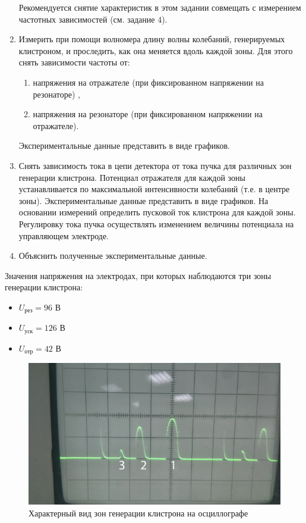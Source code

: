\begin{enumerate}
	Рекомендуется снятие характеристик в этом задании совмещать с измерением частотных зависимостей (см. задание 4).

	\item Измерить при помощи волномера длину волны колебаний, генерируемых клистроном, и проследить, как она меняется вдоль каждой зоны. Для
	этого снять зависимости частоты от:
		\begin{enumerate}
			\item  напряжения на отражателе (при фиксированном напряжении на резонаторе) ,
			\item  напряжения на резонаторе (при фиксированном напряжении на отражателе).
		\end{enumerate}
	
	Экспериментальные данные представить в виде графиков.

	\item  Снять зависимость тока в цепи детектора от тока пучка для различных зон генерации клистрона. Потенциал отражателя для каждой зоны устанавливается по максимальной интенсивности колебаний (т.е. в центре зоны). Экспериментальные данные представить в виде графиков. На основании измерений определить пусковой ток клистрона для каждой зоны. Регулировку	тока пучка осуществлять изменением величины потенциала на управляющем электроде.

	\item  Объяснить полученные экспериментальные данные.

\end{enumerate}
\newpage
Значения напряжения на электродах, при которых наблюдаются три зоны генерации клистрона:
\begin{itemize}
	\item $U_{\text{рез}}=96$ В
	\item $U_{\text{уск}}=126$ В
	\item $U_{\text{отр}}=42$ В
\end{itemize}
\begin{figure}[h!]
	\centering
	\includegraphics[width=\linewidth]{img/img1}
	\caption{Характерный вид зон генерации клистрона на осциллографе}
	\label{fig:img1}
\end{figure}

